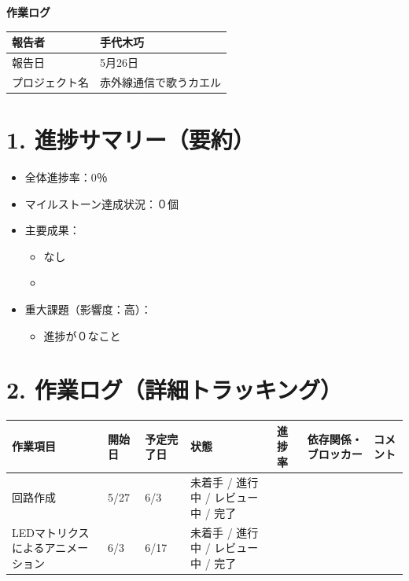 \documentclass[a4paper,11pt]{ltjsarticle}
\begin{document}
\begin{center}
    {\LARGE \textbf{作業ログ}}\\[1em]
\end{center}

\begin{tabular}{|p{4cm}|p{10cm}|}
\hline
報告者 & 手代木巧\\
\hline
報告日 & 5月26日\\
\hline
プロジェクト名 & 赤外線通信で歌うカエル\\
\hline
\end{tabular}

\vspace{1em}

\section{1. 進捗サマリー（要約）}

\begin{itemize}
    \item 全体進捗率：0％\
    \item マイルストーン達成状況：０個
    \item 主要成果：
    \begin{itemize}
        \item なし
        \item \underline{\hspace{1cm}}
    \end{itemize}
    \item 重大課題（影響度：高）：
    \begin{itemize}
        \item 進捗が０なこと
    \end{itemize}
\end{itemize}

\section{2. 作業ログ（詳細トラッキング）}

\renewcommand{\arraystretch}{1.5}

\begin{longtable}{|p{2.2cm}|p{1.8cm}|p{2cm}|p{2cm}|p{1.5cm}|p{3cm}|p{2.5cm}|}
\hline
\rowcolor[gray]{0.9}
作業項目 & 開始日 & 予定完了日 & 状態 & 進捗率 & 依存関係・ブロッカー & コメント \\
\hline
回路作成 & 5/27& 6/3& 未着手 / 進行中 / レビュー中 / 完了 & & & \\
\hline
LEDマトリクスによるアニメーション & 6/3& 6/17& 未着手 / 進行中 / レビュー中 / 完了 & & & \\
\hline
\end{longtable}
\end{document}
